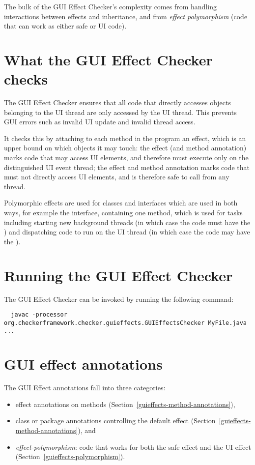 The bulk of the GUI Effect Checker's complexity comes from handling interactions between effects and
inheritance, and from \emph{effect polymorphism} (code that can work as either safe or UI code).


\section{What the GUI Effect Checker checks\label{guieffects-checks}}

The GUI Effect Checker ensures that all code that directly accesses objects belonging to the UI
thread are only accessed by the UI thread.  This prevents GUI errors such
as invalid UI update and invalid thread access.

It checks this by attaching to each method in the program an effect, which is an upper bound on
which objects it may touch: the  effect (and method annotation) marks code that may
access UI elements, and therefore must execute only on the distinguished UI event thread; the
 effect and method annotation marks code that must not directly access UI
elements, and is therefore safe to call from any thread.

Polymorphic effects are used for classes and interfaces which are used in both ways, for example the
 interface, containing one method, which is used for tasks including
starting new background threads (in which case the code must have the ) and
dispatching code to run on the UI thread (in which case the code may have the ).

\section{Running the GUI Effect Checker\label{guieffects-running}}

The GUI Effect Checker can be invoked by running the following command:
\begin{Verbatim}
  javac -processor org.checkerframework.checker.guieffects.GUIEffectsChecker MyFile.java ...
\end{Verbatim}


\section{GUI effect annotations\label{guieffects-annotations}}
The GUI Effect annotations fall into three categories:

\begin{itemize}
\item
  effect annotations on methods (Section~\ref{guieffects-method-annotations}),
\item
 class or package annotations controlling the default effect (Section~\ref{guieffects-method-annotations}), and
\item
  \emph{effect-polymorphism}:  code that works for both the safe effect and
  the UI effect (Section~\ref{guieffects-polymorphism}).
\end{itemize}


